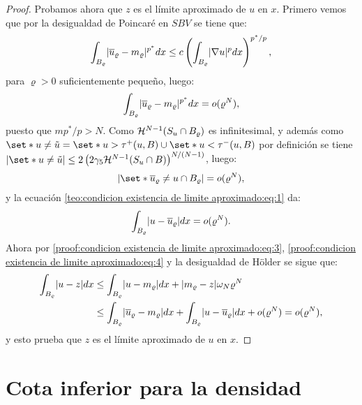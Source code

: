 \documentclass[a4paper,11pt,spanish, twoside, leqno]{tfm-uam}
\begin{document}
\begin{proof}
Probamos ahora que $z$ es el límite aproximado de $u$ en $x$. Primero vemos que por la desigualdad de Poincaré en $SBV$ se tiene que: 
\begin{align*}
\int_{B_{\varrho}}\lvert\overline{u}_{\varrho}-m_{\varrho}\rvert^{p^{*}}dx\leq c\left ( \int_{B_{\varrho}}\lvert\nabla{u}\rvert^{p} dx\right )^{p^{*}/p},
\end{align*}
para $\varrho>0$ suficientemente pequeño, luego:
\begin{align}\label{proof:condicion existencia de limite aproximado:eq:3}
\int_{B_{\varrho}}\lvert\overline{u}_{\varrho}-m_{\varrho}\rvert^{p^{*}}dx=o(\varrho^{N}),
\end{align} 
puesto que $mp^{*}/p>N$. Como $\mathcal{H}^{N-1}(S_{u}\cap B_{\varrho})$ es infinitesimal, y además como $\set*{u\not = \tilde{u}}=\set*{u>\tau^{+}(u,B)}\cup \set*{u<\tau^{-}(u, B)}$ por definición se tiene $\abs{\set*{u\not = \tilde{u}}}\leq 2\left ( 2\gamma_{5}\Hm{N-1}(S_{u}\cap B)\right )^{N/(N-1)}$, luego:
\begin{align*}
\abs*{\set*{\overline{u}_{\varrho}\not = u}\cap B_{\varrho}}=o(\varrho^{N}),
\end{align*}
y la ecuación \ref{teo:condicion existencia de limite aproximado:eq:1} da:
\begin{align}\label{proof:condicion existencia de limite aproximado:eq:4}
\int_{B_{\varrho}}\abs*{u-\overline{u}_{\varrho}}dx=o(\varrho^{N}).
\end{align}
Ahora por \ref{proof:condicion existencia de limite aproximado:eq:3}, \ref{proof:condicion existencia de limite aproximado:eq:4} y la desigualdad de Hölder se sigue que:
\begin{align*}
\int_{B_{\varrho}}\lvert u-z\rvert dx &\leq \int_{B_{\varrho}}\lvert u-m_{\varrho}\rvert dx+\lvert m_{\varrho}-z\rvert\omega_{N}\varrho^{N}
\\& \leq \int_{B_{\varrho}}\lvert\overline{u}_{\varrho}-m_{\varrho}\rvert dx+\int_{B_{\varrho}}\lvert u-\overline{u}_{\varrho}\rvert dx+o(\varrho^{N})=o(\varrho^{N}),
\end{align*}
y esto prueba que $z$ es el límite aproximado de $u$ en $x$.
\end{proof}

\section{Cota inferior para la densidad}
\end{document}
